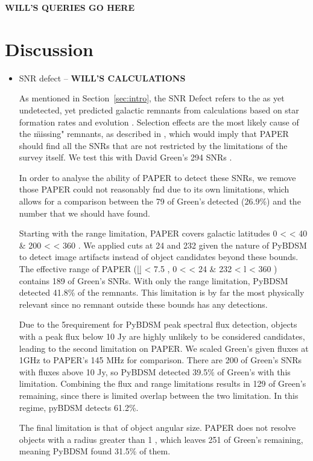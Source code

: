 \documentclass[useAMS,usenatbib]{mn2e}
\begin{document}
{\bf WILL'S QUERIES GO HERE}

\section{Discussion}
\label{sec:disc}

\begin{itemize}
\item SNR defect -- {\bf WILL'S CALCULATIONS}

As mentioned in Section~\ref{sec:intro}, the SNR Defect refers to the as yet undetected, yet predicted galactic remnants from calculations based on star formation rates and evolution \citep{Li.91,Pavlovic.13}.  Selection effects are the most likely cause of the \"missing" remnants, as described in , which would imply that PAPER should find all the SNRs that are not restricted by the limitations of the survey itself.  We test this with David Green's 294 SNRs .  

In order to analyse the ability of PAPER to detect these SNRs, we remove those PAPER could not reasonably fnd due to its own limitations, which allows for a comparison between the 79 of Green’s detected (26.9\%) and the number that we should have found.  

Starting with the range limitation, PAPER covers galactic latitudes 0 < \ell < 40 \& 200 < \ell < 360 \degree.  We applied cuts at 24 \degree and 232 \degree given the nature of PyBDSM to detect image artifacts instead of object candidates beyond these bounds.  The effective range of PAPER (|\b| < 7.5 \degree, 0 < \ell < 24 & 232 < l < 360 \degree) contains 189 of Green’s SNRs.  With only the range limitation, PyBDSM detected 41.8\% of the remnants.  This limitation is by far the most physically relevant since no remnant outside these bounds has any detections. 

Due to the 5\σ requirement for PyBDSM peak spectral flux detection, objects with a peak flux below 10 Jy are highly unlikely to be considered candidates, leading to the second limitation on PAPER.  We scaled Green’s given fluxes at 1GHz to PAPER’s 145 MHz for comparison.  There are 200 of Green’s SNRs with fluxes above 10 Jy, so PyBDSM detected 39.5\% of Green’s with this limitation.  Combining the flux and range limitations results in 129 of Green’s remaining, since there is limited overlap between the two limitation.  In this regime, pyBDSM detects 61.2\%.  

The final limitation is that of object angular size.  PAPER does not resolve objects with a radius greater than 1 \degree, which leaves 251 of Green’s remaining, meaning PyBDSM found 31.5\% of them.  


\end{itemize}
\end{document}
